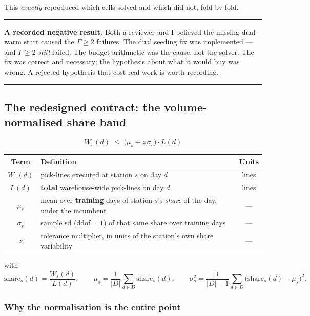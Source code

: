 \documentclass[11pt,a4paper]{article}
\newenvironment{keybox}
  {\par\medskip\noindent\rule{\linewidth}{0.9pt}\par\nobreak\smallskip\ignorespaces}
  {\par\smallskip\nobreak\noindent\rule{\linewidth}{0.9pt}\par\medskip}
\begin{document}
This \emph{exactly} reproduced which cells solved and which did not, fold by
fold.

\begin{keybox}
\textbf{A recorded negative result.} Both a reviewer and I believed the missing
dual warm start caused the $\Gamma\ge2$ failures. The dual seeding fix was
implemented --- and $\Gamma\ge2$ \emph{still} failed. The budget arithmetic was
the cause, not the solver. The fix was correct and necessary; the hypothesis
about what it would buy was wrong. A rejected hypothesis that cost real work is
worth recording.
\end{keybox}

\subsection{The redesigned contract: the volume-normalised share band}

\begin{equation}
  \boxed{\;
  W_s(d) \;\le\; \bigl(\mu_s + z\,\sigma_s\bigr)\cdot L(d)
  \;}
  \label{eq:shareband}
\end{equation}

\begin{center}
\begin{tabular}{clc}
\toprule
Term & Definition & Units \\
\midrule
$W_s(d)$  & pick-lines executed at station $s$ on day $d$ & lines \\
$L(d)$    & \textbf{total} warehouse-wide pick-lines on day $d$ & lines \\
$\mu_s$   & mean over \textbf{training} days of station $s$'s \emph{share} of the day, under the incumbent & --- \\
$\sigma_s$& sample sd (ddof$=1$) of that same share over training days & --- \\
$z$       & tolerance multiplier, in units of the station's own share variability & --- \\
\bottomrule
\end{tabular}
\end{center}

with
\[
  \mathrm{share}_s(d) = \frac{W_s(d)}{L(d)},
  \qquad
  \mu_s = \frac{1}{|D|}\sum_{d\in D}\mathrm{share}_s(d),
  \qquad
  \sigma_s^2 = \frac{1}{|D|-1}\sum_{d\in D}\bigl(\mathrm{share}_s(d)-\mu_s\bigr)^2 .
\]

\subsubsection*{Why the normalisation is the entire point}
\end{document}
